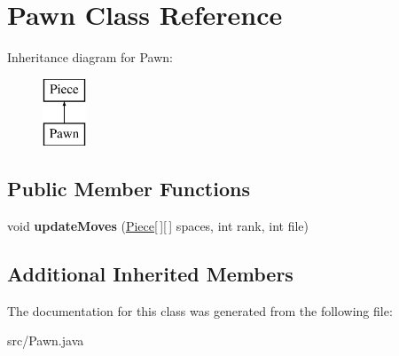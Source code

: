 \hypertarget{class_pawn}{\section{Pawn Class Reference}
\label{class_pawn}
}
Inheritance diagram for Pawn\-:\begin{figure}[H]
\begin{center}
\leavevmode
\includegraphics[height=2.000000cm]{class_pawn}
\end{center}
\end{figure}
\subsection*{Public Member Functions}
\begin{DoxyCompactItemize}
\item 
\hypertarget{class_pawn_aecc2590ecf87f465a7593ef67569fc47}{void {\bfseries update\-Moves} (\hyperlink{class_piece}{Piece}\mbox{[}$\,$\mbox{]}\mbox{[}$\,$\mbox{]} spaces, int rank, int file)}\label{class_pawn_aecc2590ecf87f465a7593ef67569fc47}

\end{DoxyCompactItemize}
\subsection*{Additional Inherited Members}


The documentation for this class was generated from the following file\-:\begin{DoxyCompactItemize}
\item 
src/Pawn.\-java\end{DoxyCompactItemize}

